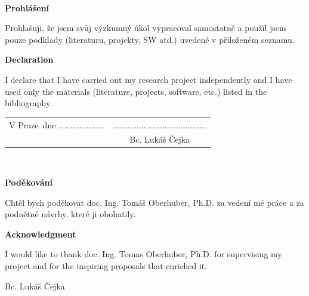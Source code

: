 \documentclass[12pt,a4paper,oneside,czech,american]{book} %
\newcommand{\tb}{\textbf} %
\newcommand{\paperAuthor}{Bc. Lukáš Čejka}   				 %
\newcommand{\place}{Praze} 									 %
\newcommand{\declarationCZ}{Prohlašuji, že jsem svůj výzkumný úkol vypracoval samostatně a použil jsem pouze podklady (literaturu, projekty, SW atd.) uvedené v přiloženém seznamu.}
\newcommand{\declarationEN}{I declare that I have carried out my research project independently and I have used only the materials (literature, projects, software, etc.) listed in the bibliography.}
\newcommand{\acknowledgementCZ}{Chtěl bych poděkovat doc. Ing. Tomáš Oberhuber, Ph.D. za vedení mé práce a za podnětné návrhy, které ji obohatily.}
\newcommand{\acknowledgementEN}{I would like to thank doc. Ing. Tomas Oberhuber, Ph.D. for supervising my project and for the inspiring proposals that enriched it.}
\begin{document}
\newpage 			  %
\thispagestyle{empty} %

~ 					  %
\vfill 				  %

\tb{Prohlášení} 	  %

\vspace{1em} 		  %
\declarationCZ

%
\vspace{1em}
\tb{Declaration}

\vspace{1em}
\declarationEN
{}%

\vspace{2em}  									 							  %
\hspace{-0.5em}\begin{tabularx}{\textwidth}{X c} 							  %
V \place\ dne .................... &........................................ \\ %
	& \paperAuthor
\end{tabularx} %




\newpage
\thispagestyle{empty}

~
\vfill %

\tb{Poděkování}

\vspace{1em} %
\acknowledgementCZ

%
\vspace{1em}
\tb{Acknowledgment}

%
\vspace{1em} %
\acknowledgementEN
\begin{flushright}
\paperAuthor
\end{flushright}  %




\newpage   			  %
\thispagestyle{empty} %

\newbox\odstavecbox
\newlength\vyskaodstavce
\newcommand\odstavec[2]{%
    \setbox\odstavecbox=\hbox{%
         \parbox[t]{#1}{#2\vrule width 0pt depth 4pt}}%
    \global\vyskaodstavce=\dp\odstavecbox
    \box\odstavecbox}
\newcommand{\delka}{120mm} %
\end{document}
